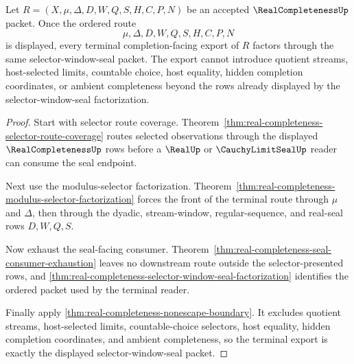 \begin{theorem}
\label{thm:real-completeness-selector-window-terminal-export}
Let $R=(X,\mu,\Delta,D,W,Q,S,H,C,P,N)$ be an accepted $\RealCompletenessUp$ packet. Once the ordered route
$$
\mu,\Delta,D,W,Q,S,H,C,P,N
$$
is displayed, every terminal completion-facing export of $R$ factors through the same selector-window-seal packet. The export cannot introduce quotient streams, host-selected limits, countable choice, host equality, hidden completion coordinates, or ambient completeness beyond the rows already displayed by the selector-window-seal factorization.
\end{theorem}
\begin{proof}
Start with selector route coverage. Theorem~\ref{thm:real-completeness-selector-route-coverage} routes selected observations through the displayed $\RealCompletenessUp$ rows before a $\RealUp$ or $\CauchyLimitSealUp$ reader can consume the seal endpoint.

Next use the modulus-selector factorization. Theorem~\ref{thm:real-completeness-modulus-selector-factorization} forces the front of the terminal route through $\mu$ and $\Delta$, then through the dyadic, stream-window, regular-sequence, and real-seal rows $D,W,Q,S$.

Now exhaust the seal-facing consumer. Theorem~\ref{thm:real-completeness-seal-consumer-exhaustion} leaves no downstream route outside the selector-presented rows, and \autoref{thm:real-completeness-selector-window-seal-factorization} identifies the ordered packet used by the terminal reader.

Finally apply \autoref{thm:real-completeness-nonescape-boundary}. It excludes quotient streams, host-selected limits, countable-choice selectors, host equality, hidden completion coordinates, and ambient completeness, so the terminal export is exactly the displayed selector-window-seal packet.
\end{proof}

